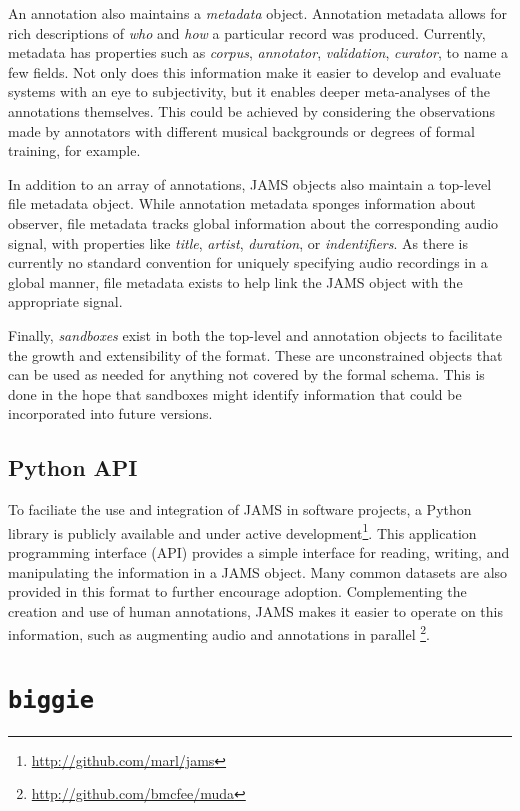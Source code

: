 An annotation also maintains a \emph{metadata} object.
Annotation metadata allows for rich descriptions of \emph{who} and \emph{how} a particular record was produced.
Currently, metadata has properties such as \emph{corpus}, \emph{annotator}, \emph{validation}, \emph{curator}, to name a few fields.
Not only does this information make it easier to develop and evaluate systems with an eye to subjectivity, but it enables deeper meta-analyses of the annotations themselves.
This could be achieved by considering the observations made by annotators with different musical backgrounds or degrees of formal training, for example.

In addition to an array of annotations, JAMS objects also maintain a top-level file metadata object.
While annotation metadata sponges information about observer, file metadata tracks global information about the corresponding audio signal, with properties like \emph{title}, \emph{artist}, \emph{duration}, or \emph{indentifiers}.
As there is currently no standard convention for uniquely specifying audio recordings in a global manner, file metadata exists to help link the JAMS object with the appropriate signal.

Finally, \emph{sandboxes} exist in both the top-level and annotation objects to facilitate the growth and extensibility of the format.
These are unconstrained objects that can be used as needed for anything not covered by the formal schema.
This is done in the hope that sandboxes might identify information that could be incorporated into future versions.


\subsection{Python API}
\label{subsec:jams_tools}

To faciliate the use and integration of JAMS in software projects, a Python library is publicly available and under active development\footnote{\url{http://github.com/marl/jams}}.
This application programming interface (API) provides a simple interface for reading, writing, and manipulating the information in a JAMS object.
Many common datasets are also provided in this format to further encourage adoption.
Complementing the creation and use of human annotations, JAMS makes it easier to operate on this information, such as augmenting audio and annotations in parallel \footnote{\url{http://github.com/bmcfee/muda}}.


\section{\texttt{biggie}}
\label{sec:biggie}

